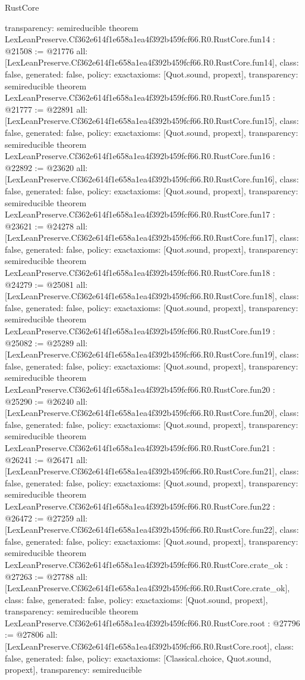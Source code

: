 \begin{lexlean}{RustCore}
\begin{coremodule}
{  transparency: semireducible
}
theorem LexLeanPreserve.Cf362e614f1e658a1ea4f392b459fcf66.R0.RustCore.fun14 : @21508 := @21776 {
  all: [LexLeanPreserve.Cf362e614f1e658a1ea4f392b459fcf66.R0.RustCore.fun14],
  class: false,
  generated: false,
  policy: exact{axioms: [Quot.sound, propext]},
  transparency: semireducible
}
theorem LexLeanPreserve.Cf362e614f1e658a1ea4f392b459fcf66.R0.RustCore.fun15 : @21777 := @22891 {
  all: [LexLeanPreserve.Cf362e614f1e658a1ea4f392b459fcf66.R0.RustCore.fun15],
  class: false,
  generated: false,
  policy: exact{axioms: [Quot.sound, propext]},
  transparency: semireducible
}
theorem LexLeanPreserve.Cf362e614f1e658a1ea4f392b459fcf66.R0.RustCore.fun16 : @22892 := @23620 {
  all: [LexLeanPreserve.Cf362e614f1e658a1ea4f392b459fcf66.R0.RustCore.fun16],
  class: false,
  generated: false,
  policy: exact{axioms: [Quot.sound, propext]},
  transparency: semireducible
}
theorem LexLeanPreserve.Cf362e614f1e658a1ea4f392b459fcf66.R0.RustCore.fun17 : @23621 := @24278 {
  all: [LexLeanPreserve.Cf362e614f1e658a1ea4f392b459fcf66.R0.RustCore.fun17],
  class: false,
  generated: false,
  policy: exact{axioms: [Quot.sound, propext]},
  transparency: semireducible
}
theorem LexLeanPreserve.Cf362e614f1e658a1ea4f392b459fcf66.R0.RustCore.fun18 : @24279 := @25081 {
  all: [LexLeanPreserve.Cf362e614f1e658a1ea4f392b459fcf66.R0.RustCore.fun18],
  class: false,
  generated: false,
  policy: exact{axioms: [Quot.sound, propext]},
  transparency: semireducible
}
theorem LexLeanPreserve.Cf362e614f1e658a1ea4f392b459fcf66.R0.RustCore.fun19 : @25082 := @25289 {
  all: [LexLeanPreserve.Cf362e614f1e658a1ea4f392b459fcf66.R0.RustCore.fun19],
  class: false,
  generated: false,
  policy: exact{axioms: [Quot.sound, propext]},
  transparency: semireducible
}
theorem LexLeanPreserve.Cf362e614f1e658a1ea4f392b459fcf66.R0.RustCore.fun20 : @25290 := @26240 {
  all: [LexLeanPreserve.Cf362e614f1e658a1ea4f392b459fcf66.R0.RustCore.fun20],
  class: false,
  generated: false,
  policy: exact{axioms: [Quot.sound, propext]},
  transparency: semireducible
}
theorem LexLeanPreserve.Cf362e614f1e658a1ea4f392b459fcf66.R0.RustCore.fun21 : @26241 := @26471 {
  all: [LexLeanPreserve.Cf362e614f1e658a1ea4f392b459fcf66.R0.RustCore.fun21],
  class: false,
  generated: false,
  policy: exact{axioms: [Quot.sound, propext]},
  transparency: semireducible
}
theorem LexLeanPreserve.Cf362e614f1e658a1ea4f392b459fcf66.R0.RustCore.fun22 : @26472 := @27259 {
  all: [LexLeanPreserve.Cf362e614f1e658a1ea4f392b459fcf66.R0.RustCore.fun22],
  class: false,
  generated: false,
  policy: exact{axioms: [Quot.sound, propext]},
  transparency: semireducible
}
theorem LexLeanPreserve.Cf362e614f1e658a1ea4f392b459fcf66.R0.RustCore.crate_ok : @27263 := @27788 {
  all: [LexLeanPreserve.Cf362e614f1e658a1ea4f392b459fcf66.R0.RustCore.crate_ok],
  class: false,
  generated: false,
  policy: exact{axioms: [Quot.sound, propext]},
  transparency: semireducible
}
theorem LexLeanPreserve.Cf362e614f1e658a1ea4f392b459fcf66.R0.RustCore.root : @27796 := @27806 {
  all: [LexLeanPreserve.Cf362e614f1e658a1ea4f392b459fcf66.R0.RustCore.root],
  class: false,
  generated: false,
  policy: exact{axioms: [Classical.choice, Quot.sound, propext]},
  transparency: semireducible
}


\end{coremodule}
\end{lexlean}
